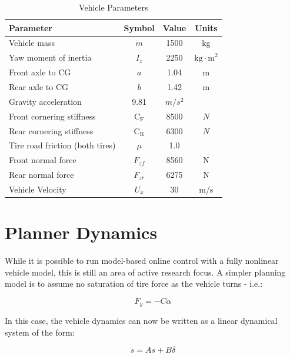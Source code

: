 \documentclass[11pt]{article}
\begin{document}
\begin{table}[h]
\small
\begin{center}
\caption{Vehicle Parameters}\label{tb:params}
\begin{tabular}{lccc}
Parameter & Symbol & Value & Units \\\hline
Vehicle mass & $m$ & 1500 & kg \\
Yaw moment of inertia & $I_z$ & 2250 & $\mathrm{kg \cdot m}^2$\\
Front axle to CG & $a$ & 1.04 & m\\
Rear axle to CG & $b$ & 1.42 & m\\
Gravity acceleration & 9.81 & $m/s^2$ \\
Front cornering stiffness & $\mathrm{C}_\mathrm{F}$ & 8500 & $N$ \\
Rear cornering stiffness & $\mathrm{C}_\mathrm{R}$ & 6300 & $N$ \\
Tire road friction (both tires)  & $\mu$ & 1.0 & \\
Front normal force & $F_{zf}$ & 8560 & $\mathrm{N}$ \\
Rear normal force & $F_{zr}$ & 6275 & $\mathrm{N}$ \\ 
Vehicle Velocity & $U_x$ & 30 & m/s \\
\end{tabular}
\end{center}
\end{table}


\section{Planner Dynamics}



While it is possible to run model-based online control with a fully nonlinear vehicle model, this is still an area
of active research focus. A simpler planning model is to assume no saturation of tire force as the vehicle turns - i.e.:

\begin{equation}
    F_y = - C\alpha
\end{equation} 

In this case, the vehicle dynamics can now be written as a linear dynamical system of the form:

\begin{equation}
\dot{s} = As + B\delta	
\end{equation}
\end{document}
